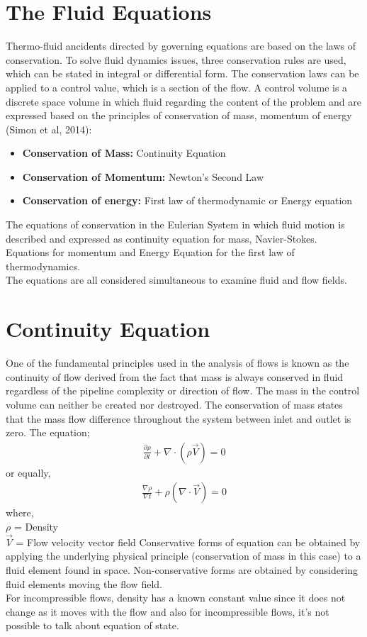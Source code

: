 \documentclass[11pt]{report}
\newcommand{\bt}[1]{\textbf{#1}}
\begin{document}
	
	\section{The Fluid Equations}
	Thermo-fluid ancidents directed by governing equations are based on the laws of conservation. To solve fluid dynamics issues, three conservation rules are used, which can be stated in integral or differential form. The conservation laws can be applied to a control value, which is a section of the flow. A control volume is a discrete space volume in which fluid regarding the content of the problem and are expressed based on the principles of conservation of mass, momentum of  energy (Simon et al, 2014):
	\begin{itemize}[label=--]
		\item\bt{Conservation of Mass:} Continuity Equation
		\item\bt{Conservation of Momentum:} Newton's Second Law
		\item\bt{Conservation of energy:} First law of thermodynamic or Energy equation
	\end{itemize}
	The equations of conservation in the Eulerian System in which fluid motion is described and expressed as continuity equation for mass, Navier-Stokes. Equations for momentum and Energy Equation for the first law of thermodynamics.\\
	The equations are all considered simultaneous to examine fluid and flow fields.
	
	\section{Continuity Equation}
	One of the fundamental principles used in the analysis of flows is known as the continuity of flow derived from the fact that mass is always conserved in fluid regardless of the pipeline complexity or direction of flow. The mass in the control volume can neither be created nor destroyed. The conservation of mass states that the mass flow difference throughout the system between inlet and outlet is zero. The equation;
	\begin{eqnarray}
		\frac{\partial \rho}{\partial t} + \nabla \cdot (\rho \vec{V}) = 0 \label{eq:2_1}
	\end{eqnarray}
	or equally,
	\begin{eqnarray}
		\frac{\nabla \rho}{\nabla t} + \rho(\nabla \cdot \vec{V}) = 0 \label{eq:2_2}
	\end{eqnarray}
	where, \\
	\hspace*{1cm} $\rho$ = Density\\
	\hspace*{1cm} $\vec{V}$ = Flow velocity vector field
	Conservative forms of equation can be obtained by applying the underlying physical principle (conservation of mass in this case) to a fluid element found in space. Non-conservative forms are obtained by considering fluid elements moving the flow field.\\
	For incompressible flows, density has a known constant value since it does not change as it moves with the flow and also for incompressible flows, it's not possible to talk about equation of state.
	
\end{document}
